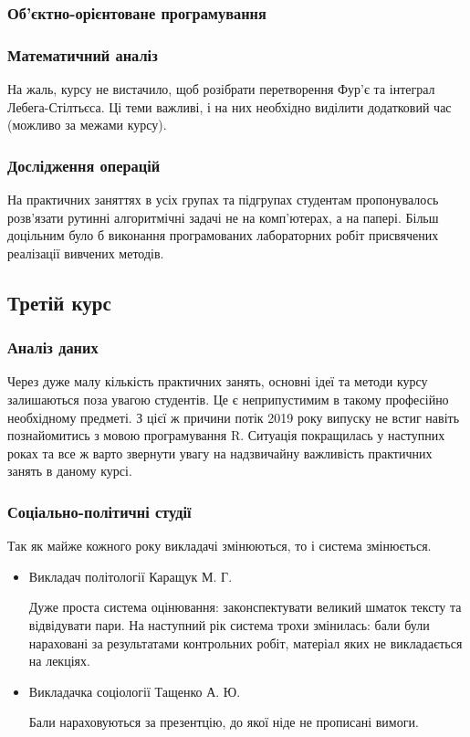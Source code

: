 \documentclass[14pt, a4paper]{extarticle}  %
\begin{document}
\subsubsection{Об'єктно-орієнтоване програмування}
 

\subsubsection{Математичний аналіз}

На жаль, курсу не вистачило, щоб розібрати перетворення Фур'є та інтеграл Лебега-Стілтьєса. Ці теми важливі, і на них необхідно виділити додатковий час (можливо за межами курсу). 

\subsubsection{Дослідження операцій}

На практичних заняттях в усіх групах та підгрупах студентам пропонувалось розв'язати рутинні алгоритмічні задачі не на комп'ю\-терах, а на папері. Більш доцільним було б виконання програмованих лабораторних робіт присвячених реалізації вивчених методів. 

\subsection{Третій курс}
\subsubsection{Аналіз даних}

Через дуже малу кількість практичних занять, основні ідеї та методи курсу залишаються поза увагою студентів. Це є неприпустимим в такому професійно необхідному предметі. З цієї ж причини потік 2019 року випуску не встиг навіть познайомитись з мовою програмування R. Ситуація покращилась у наступних роках та все ж варто звернути увагу на надзвичайну важливість практичних занять в даному курсі. 

\subsubsection{Соціально-політичні студії}
Так як майже кожного року викладачі змінюються, то і система змінюється. 
\begin{itemize}
\item Викладач політології Каращук М. Г.

Дуже проста система оцінювання: законспектувати великий шматок тексту та відвідувати пари. На наступний рік система трохи змінилась: бали були нараховані за результатами контрольних робіт, матеріал яких не викладається на лекціях.

\item Викладачка соціології Тащенко А. Ю. 

Бали нараховуються за презентцію, до якої ніде не прописані вимоги. 
\end{itemize}
\end{document}
